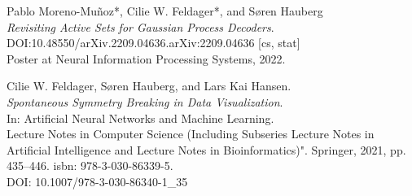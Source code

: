 



Pablo Moreno-Mu\~{n}oz*, Cilie W. Feldager*, and Søren Hauberg \\ \textit{Revisiting Active Sets for Gaussian Process Decoders}.
\\ \textsc{DOI}:10.48550/arXiv.2209.04636.arXiv:2209.04636 [cs, stat]
\\ Poster at Neural Information Processing Systems, 2022.

\vspace{1cm}
Cilie W. Feldager, Søren Hauberg, and Lars Kai Hansen.\\  \textit{Spontaneous Symmetry Breaking in Data Visualization}.\\ In: Artificial Neural Networks and Machine Learning. \\
Lecture Notes in Computer Science (Including Subseries Lecture Notes in Artificial Intelligence and Lecture Notes in Bioinformatics)".
Springer, 2021, pp. 435–446. isbn: 978-3-030-86339-5.\\
\textsc{DOI}: 10.1007/978-3-030-86340-1\_35

%


